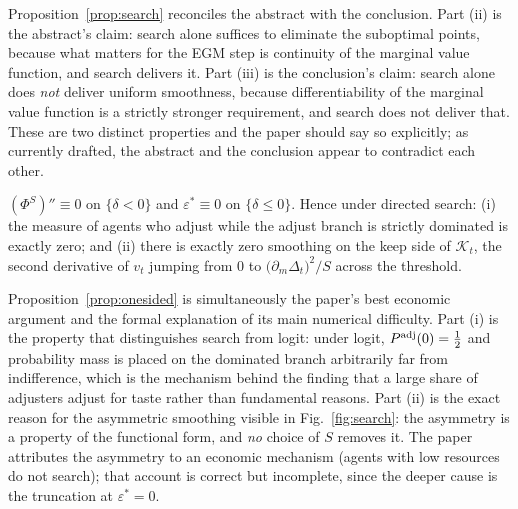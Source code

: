 Proposition~\ref{prop:search} reconciles the abstract with the conclusion. Part (ii) is
the abstract's claim: search alone suffices to eliminate the suboptimal points, because
what matters for the EGM step is continuity of the marginal value function, and search
delivers it. Part (iii) is the conclusion's claim: search alone does \emph{not} deliver
uniform smoothness, because differentiability of the marginal value function is a
strictly stronger requirement, and search does not deliver that. These are two
distinct properties and the paper should say so explicitly; as currently drafted, the
abstract and the conclusion appear to contradict each other.

\begin{proposition}
\label{prop:onesided}
$(\Phi^{S})''\equiv0$ on $\{\delta<0\}$ and $\varepsilon^{\ast}\equiv0$ on
$\{\delta\le0\}$. Hence under directed search: (i) the measure of agents who adjust
while the adjust branch is strictly dominated is exactly zero; and (ii) there is
exactly zero smoothing on the keep side of $\mathcal{K}_t$, the second derivative of
$v_t$ jumping from $0$ to $\big(\partial_m\Delta_t\big)^{2}/S$ across the threshold.
\end{proposition}

Proposition~\ref{prop:onesided} is simultaneously the paper's best economic argument
and the formal explanation of its main numerical difficulty. Part (i) is the property
that distinguishes search from logit: under logit, $P^{\mathrm{adj}}(0)=\tfrac12$ and
probability mass is placed on the dominated branch arbitrarily far from indifference,
which is the mechanism behind the finding that a large share of adjusters adjust for
taste rather than fundamental reasons. Part (ii) is the exact reason for the asymmetric
smoothing visible in Fig.~\ref{fig:search}: the asymmetry is a property of the
functional form, and \emph{no} choice of $S$ removes it. The paper attributes the
asymmetry to an economic mechanism (agents with low resources do not search); that
account is correct but incomplete, since the deeper cause is the truncation at
$\varepsilon^{\ast}=0$.

